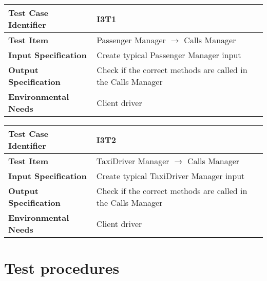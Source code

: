 \begin{table}[!htbp]
\begin{center}
\begin{tabular}[t]{p{}p{}}

\hline
\textbf{Test Case Identifier} & I3T1 \\
\hline
\textbf{Test Item} & Passenger Manager $\rightarrow$ Calls Manager \\
\hline
\textbf{Input Specification} & Create typical Passenger Manager input \\
\hline
\textbf{Output Specification} & Check if the correct methods are called in the Calls Manager \\
\hline
\textbf{Environmental Needs} & Client driver \\
\hline

\end{tabular}
\end{center}
\end{table}

\begin{table}[!htbp]
\begin{center}
\begin{tabular}[t]{p{}p{}}

\hline
\textbf{Test Case Identifier} & I3T2 \\
\hline
\textbf{Test Item} & TaxiDriver Manager $\rightarrow$ Calls Manager \\
\hline
\textbf{Input Specification} & Create typical TaxiDriver Manager input \\
\hline
\textbf{Output Specification} & Check if the correct methods are called in the Calls Manager \\
\hline
\textbf{Environmental Needs} & Client driver \\
\hline

\end{tabular}
\end{center}
\end{table}

\section{Test procedures}

